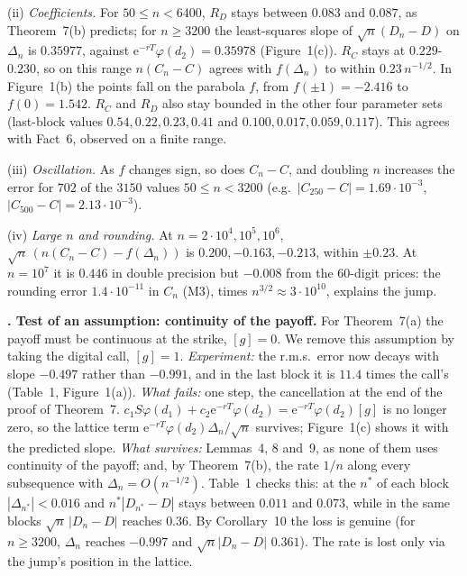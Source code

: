 \documentclass[11pt,a4paper]{article}
\theoremstyle{tight}
\theoremstyle{tightrm}
\newcounter{sect}\setcounter{sect}{-1}
\newcommand{\sect}[1]{\par\vspace{1.5pt}\noindent\stepcounter{sect}\textbf{\thesect. #1}\enspace}
\newcommand{\e}{\mathrm{e}}
\begin{document}
(ii) \emph{Coefficients.} For $50\le n<6400$, $R_D$ stays between $0.083$ and $0.087$, as Theorem~7(b) predicts; for $n\ge3200$ the least-squares slope of $\sqrt n(D_n-D)$ on $\Delta_n$ is $0.35977$, against $\e^{-rT}\varphi(d_2)=0.35978$ (Figure~1(c)). $R_C$ stays at $0.229$-$0.230$, so on this range $n(C_n-C)$ agrees with $f(\Delta_n)$ to within $0.23\,n^{-1/2}$. In Figure~1(b) the points fall on the parabola $f$, from $f(\pm1)=-2.416$ to $f(0)=1.542$. $R_C$ and $R_D$ also stay bounded in the other four parameter sets (last-block values $0.54,0.22,0.23,0.41$ and $0.100,0.017,0.059,0.117$). This agrees with Fact~6, observed on a finite range.

(iii) \emph{Oscillation.} As $f$ changes sign, so does $C_n-C$, and doubling $n$ increases the error for $702$ of the $3150$ values $50\le n<3200$ (e.g.\ $|C_{250}-C|=1.69\cdot10^{-3}$, $|C_{500}-C|=2.13\cdot10^{-3}$).

(iv) \emph{Large $n$ and rounding.} At $n=2\cdot10^4,10^5,10^6$, $\sqrt n\,(n(C_n-C)-f(\Delta_n))$ is $0.200,-0.163,-0.213$, within $\pm0.23$. At $n=10^7$ it is $0.446$ in double precision but $-0.008$ from the 60-digit prices: the rounding error $1.4\cdot10^{-11}$ in $C_n$ (M3), times $n^{3/2}\approx3\cdot10^{10}$, explains the jump.

\sect{Test of an assumption: continuity of the payoff.} For Theorem~7(a) the payoff must be continuous at the strike, $[g]=0$. We remove this assumption by taking the digital call, $[g]=1$. 
\emph{Experiment:} the r.m.s.\ error now decays with slope $-0.497$ rather than $-0.991$, and in the last block it is $11.4$ times the call's (Table~1, Figure~1(a)). 
\emph{What fails:} one step, the cancellation at the end of the proof of Theorem~7. $c_1S\varphi(d_1)+c_2\e^{-rT}\varphi(d_2)=\e^{-rT}\varphi(d_2)[g]$ is no longer zero, so the lattice term $\e^{-rT}\varphi(d_2)\Delta_n/\sqrt n$ survives; Figure~1(c) shows it with the predicted slope.
\emph{What survives:} Lemmas~4, 8 and~9, as none of them uses continuity of the payoff; and, by Theorem~7(b), the rate $1/n$ along every subsequence with $\Delta_n=O(n^{-1/2})$. Table~1 checks this: at the $n^*$ of each block $|\Delta_{n^*}|<0.016$ and $n^*|D_{n^*}-D|$ stays between $0.011$ and $0.073$, while in the same blocks $\sqrt n\,|D_n-D|$ reaches $0.36$. By Corollary~10 the loss is genuine (for $n\ge3200$, $\Delta_n$ reaches $-0.997$ and $\sqrt n|D_n-D|$ $0.361$). The rate is lost only via the jump's position in the lattice.
\end{document}
